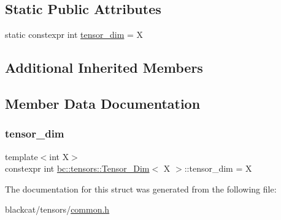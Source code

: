 \subsection*{Static Public Attributes}
\begin{DoxyCompactItemize}
\item 
static constexpr int \hyperlink{structbc_1_1tensors_1_1Tensor__Dim_a05b6e702b1f995e3ffc566a55cbabc52}{tensor\+\_\+dim} = X
\end{DoxyCompactItemize}
\subsection*{Additional Inherited Members}


\subsection{Member Data Documentation}
\mbox{\label{structbc_1_1tensors_1_1Tensor__Dim_a05b6e702b1f995e3ffc566a55cbabc52}} 
\subsubsection{\texorpdfstring{tensor\+\_\+dim}{tensor\_dim}}
{\footnotesize\ttfamily template$<$int X$>$ \\
constexpr int \hyperlink{structbc_1_1tensors_1_1Tensor__Dim}{bc\+::tensors\+::\+Tensor\+\_\+\+Dim}$<$ X $>$\+::tensor\+\_\+dim = X\hspace{0.3cm}{\ttfamily [static]}}



The documentation for this struct was generated from the following file\+:\begin{DoxyCompactItemize}
\item 
blackcat/tensors/\hyperlink{tensors_2common_8h}{common.\+h}\end{DoxyCompactItemize}

